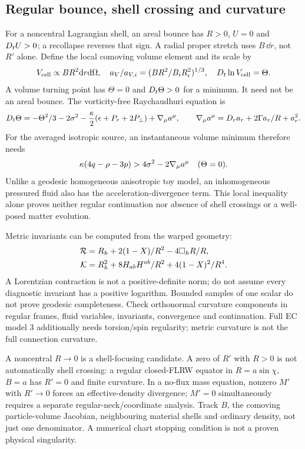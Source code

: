 \subsection{Regular bounce, shell crossing and curvature}
For a noncentral Lagrangian shell, an areal bounce has $R>0$, $U=0$ and $D_t U>0$; a recollapse reverses that sign. A radial proper stretch uses $B\,\dd r$, not $R'$ alone. Define the local comoving volume element and its scale by
\begin{equation}
 V_{\rm cell}\propto BR^2\mathrm d r\mathrm d\Omega,\quad
 a_V/a_{V,i}=(BR^2/B_iR_i^2)^{1/3},\quad D_t\ln V_{\rm cell}=\Theta.
\end{equation}
A volume turning point has $\Theta=0$ and $D_t\Theta>0$ for a minimum. It need not be an areal bounce. The vorticity-free Raychaudhuri equation is
\begin{equation}
 D_t\Theta=-\Theta^2/3-2\sigma^2-\frac{\kappa}2(\epsilon+P_r+2P_\perp)+\nabla_\mu a^\mu,
 \qquad \nabla_\mu a^\mu=D_r a_r+2\Gamma a_r/R+a_r^2.
\end{equation}
For the averaged isotropic source, an instantaneous volume minimum therefore needs
\begin{equation}
 \kappa(4q-\rho-3p)>4\sigma^2-2\nabla_\mu a^\mu\quad(\Theta=0).
\end{equation}
Unlike a geodesic homogeneous anisotropic toy model, an inhomogeneous pressured fluid also has the acceleration-divergence term. This local inequality alone proves neither regular continuation nor absence of shell crossings or a well-posed matter evolution.

Metric invariants can be computed from the warped geometry:
\begin{align}
 \mathcal R&=R_h+2(1-X)/R^2-4\Box_hR/R,\\
 \mathcal K&=R_h^2+8H_{ab}H^{ab}/R^2+4(1-X)^2/R^4.
\end{align}
A Lorentzian contraction is not a positive-definite norm; do not assume every diagnostic invariant has a positive logarithm. Bounded samples of one scalar do not prove geodesic completeness. Check orthonormal curvature components in regular frames, fluid variables, invariants, convergence and continuation. Full EC model 3 additionally needs torsion/spin regularity; metric curvature is not the full connection curvature.

A noncentral $R\to0$ is a shell-focusing candidate. A zero of $R'$ with $R>0$ is not automatically shell crossing: a regular closed-FLRW equator in $R=a\sin\chi$, $B=a$ has $R'=0$ and finite curvature. In a no-flux mass equation, nonzero $M'$ with $R'\to0$ forces an effective-density divergence; $M'=0$ simultaneously requires a separate regular-neck/coordinate analysis. Track $B$, the comoving particle-volume Jacobian, neighbouring material shells and ordinary density, not just one denominator. A numerical chart stopping condition is not a proven physical singularity.

